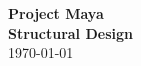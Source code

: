 \thispagestyle{empty}

\begin{minipage}{\linewidth}
    \begin{flushright}
      {\color{fancy}\normalfont\huge\bfseries Project Maya} \\
      {\color{light}\normalfont\large\bfseries Structural Design}\\
      {\color{light}\normalfont\large \today}\\
  \end{flushright}
\end{minipage}%
